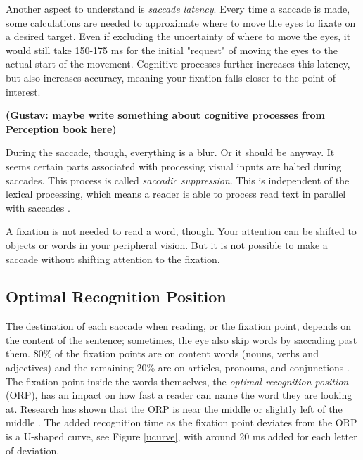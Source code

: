 Another aspect to understand is \textit{saccade latency}. Every time a saccade is made, some calculations are needed to approximate where to move the eyes to fixate on a desired target. Even if excluding the uncertainty of where to move the eyes, it would still take 150-175 ms for the initial "request" of moving the eyes to the actual start of the movement. Cognitive processes further increases this latency, but also increases accuracy, meaning your fixation falls closer to the point of interest.

\textbf{(Gustav: maybe write something about cognitive processes from Perception book here)}

During the saccade, though, everything is a blur. Or it should be anyway. It seems certain parts associated with processing visual inputs are halted during saccades. This process is called \textit{saccadic suppression}. This is independent of the lexical processing, which means a reader is able to process read text in parallel with saccades \cite{eyeMovement}.

A fixation is not needed to read a word, though. Your attention can be shifted to objects or words in your peripheral vision. But it is not possible to make a saccade without shifting attention to the fixation.

\subsection{Optimal Recognition Position} \label{ORP}
The destination of each saccade when reading, or the fixation point, depends on the content of the sentence; sometimes, the eye also skip words by saccading past them. 80\% of the fixation points are on content words (nouns, verbs and adjectives) and the remaining 20\% are on articles, pronouns, and conjunctions \cite{eysenck_cognitive_2010}. The fixation point inside the words themselves, the \textit{optimal recognition position} (ORP), has an impact on how fast a reader can name the word they are looking at. Research has shown that the ORP is near the middle or slightly left of the middle \cite{oregan_optimal_1992, nazir_letter_1998, oregan_convenient_1984}. The added recognition time as the fixation point deviates from the ORP is a U-shaped curve, see Figure \ref{ucurve}, with around 20 ms added for each letter of deviation.

